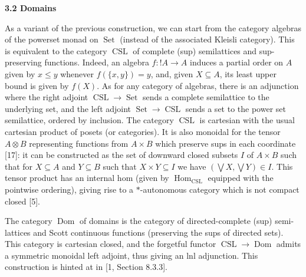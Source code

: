 \documentclass[10pt,a4paper]{article}
\begin{document}
 
 
 
\par\medskip\noindent\textbf{3.2 Domains}\par
 
 
As a variant of the previous construction, we can start from the category algebras of the powerset monad on $\operatorname{Set}$ (instead of the associated Kleisli category). This is equivalent to the category $\operatorname{CSL}$ of complete (sup) semilattices and sup-preserving functions. Indeed, an algebra $f:\mathop{!}A\to A$ induces a partial order on $A$ given by $x\leq y$ whenever $f(\{x,y\})=y$, and, given $X\subseteq A$, its least upper bound is given by $f(X)$. As for any category of algebras, there is an adjunction where the right adjoint $\operatorname{CSL}\to\operatorname{Set}$ sends a complete semilattice to the underlying set, and the left adjoint $\operatorname{Set}\to\operatorname{CSL}$ sends a set to the power set semilattice, ordered by inclusion. The category $\operatorname{CSL}$ is cartesian with the usual cartesian product of posets (or categories). It is also monoidal for the tensor $A\otimes B$ representing functions from $A\times B$ which preserve sups in each coordinate [17]: it can be constructed as the set of downward closed subsets $I$ of $A\times B$ such that for $X\subseteq A$ and $Y\subseteq B$ such that $X\times Y\subseteq I$ we have $(\bigvee X,\bigvee Y)\in I$. This tensor product has an internal hom (given by $\operatorname{Hom}_{\operatorname{CSL}}$ equipped with the pointwise ordering), giving rise to a $*$-autonomous category which is not compact closed [5].\par
 
 
 
The category $\operatorname{Dom}$ of domains is the category of directed-complete (sup) semi-lattices and Scott continuous functions (preserving the sups of directed sets). This category is cartesian closed, and the forgetful functor $\operatorname{CSL}\to\operatorname{Dom}$ admits a symmetric monoidal left adjoint, thus giving an lnl adjunction. This construction is hinted at in [1, Section 8.3.3].\par
 
 
 
\end{document}
